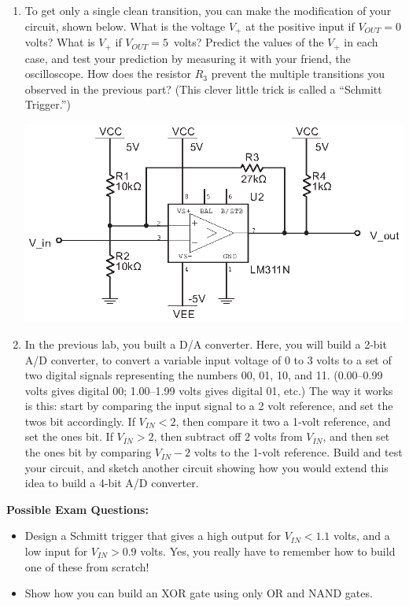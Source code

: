 \begin{enumerate}[wide]
\item To get only a single clean transition, you can make the modification of your circuit, shown below.  What is the voltage $V_+$ at the positive input if $V_{OUT}=0$ volts?  What is $V_+$ if $V_{OUT}=5$~volts?   Predict the values of the $V_+$ in each case, and test your prediction by measuring it with your friend, the oscilloscope.  How does the resistor $R_3$ prevent the multiple transitions you observed in the previous part?  (This clever little trick is called a ``Schmitt Trigger.'')

\begin{center}
\includegraphics{digital_electronics/schmitt_trigger.eps}
\end{center}

\item In the previous lab, you built a D/A converter.  Here, you will build a 2-bit A/D converter, to convert a variable input voltage of 0 to 3 volts to a set of two digital signals representing the numbers 00, 01, 10, and 11.  (0.00--0.99 volts gives digital 00; 1.00--1.99 volts gives digital 01, etc.)  The way it works is this: start by comparing the input signal to a 2 volt reference, and set the twos bit accordingly.  If $V_{IN}<2$, then compare it two a 1-volt reference, and set the ones bit.  If $V_{IN}>2$, then subtract off 2 volts from $V_{IN}$, and then set the ones bit by comparing $ V_{IN}-2$ volts to the 1-volt reference.  Build and test your circuit, and sketch another circuit showing how you would extend this idea to build a 4-bit A/D converter.

\end{enumerate}


\textbf{Possible Exam Questions:}

\begin{itemize}

\item Design a Schmitt trigger that gives a high output for $V_{IN}<1.1$ volts, and a low input for $V_{IN}>0.9$ volts.  Yes, you really have to remember how to build one of these from scratch!

\item Show how you can build an XOR gate using only OR and NAND gates.
\end{itemize}






